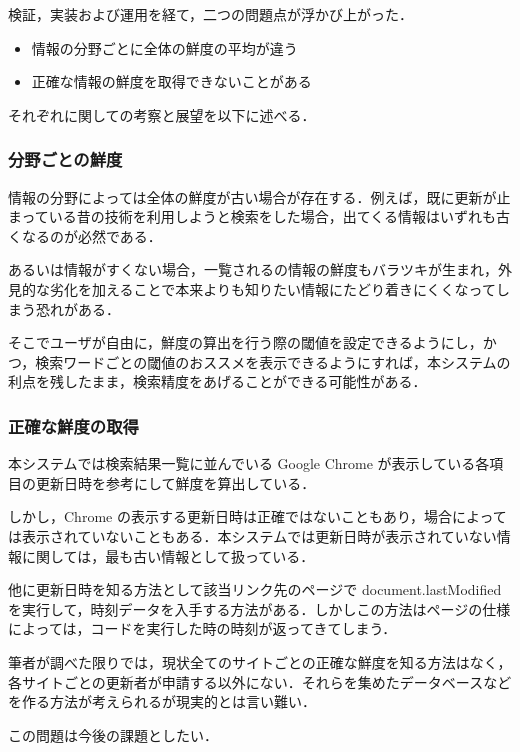 検証，実装および運用を経て，二つの問題点が浮かび上がった．

\begin{itemize}
  \item 情報の分野ごとに全体の鮮度の平均が違う
  \item 正確な情報の鮮度を取得できないことがある
\end{itemize}

それぞれに関しての考察と展望を以下に述べる．

\subsubsection{分野ごとの鮮度}

情報の分野によっては全体の鮮度が古い場合が存在する．例えば，既に更新が止まっている昔の技術を利用しようと検索をした場合，出てくる情報はいずれも古くなるのが必然である．

あるいは情報がすくない場合，一覧されるの情報の鮮度もバラツキが生まれ，外見的な劣化を加えることで本来よりも知りたい情報にたどり着きにくくなってしまう恐れがある．

そこでユーザが自由に，鮮度の算出を行う際の閾値を設定できるようにし，かつ，検索ワードごとの閾値のおススメを表示できるようにすれば，本システムの利点を残したまま，検索精度をあげることができる可能性がある．

\subsubsection{正確な鮮度の取得}

本システムでは検索結果一覧に並んでいる Google Chrome が表示している各項目の更新日時を参考にして鮮度を算出している．

しかし，Chrome の表示する更新日時は正確ではないこともあり，場合によっては表示されていないこともある．本システムでは更新日時が表示されていない情報に関しては，最も古い情報として扱っている．

他に更新日時を知る方法として該当リンク先のページで document.lastModified を実行して，時刻データを入手する方法がある．しかしこの方法はページの仕様によっては，コードを実行した時の時刻が返ってきてしまう．

筆者が調べた限りでは，現状全てのサイトごとの正確な鮮度を知る方法はなく，各サイトごとの更新者が申請する以外にない．それらを集めたデータベースなどを作る方法が考えられるが現実的とは言い難い．

この問題は今後の課題としたい．
